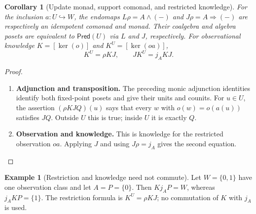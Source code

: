 \documentclass[11pt,a4paper]{article}
\numberwithin{equation}{section}
\newtheorem{corollary}[theorem]{Corollary}
\theoremstyle{definition}
\newtheorem{example}[theorem]{Example}
\theoremstyle{remark}
\theoremstyle{plain}
\begin{document}
\begin{corollary}[Update monad, support comonad, and restricted knowledge]
\label{cor:egt-update-adjoints}
For the inclusion $a:U\hookrightarrow W$, the endomaps
$L\rho=A\wedge(-)$ and $J\rho=A\Rightarrow(-)$ are respectively an
idempotent comonad and monad. Their coalgebra and algebra posets are
equivalent to $\mathsf{Pred}(U)$ via $L$ and $J$, respectively.
For observational knowledge $K=[\ker(o)]$ and $K^U=[\ker(oa)]$,
\[
 K^U=\rho KJ,\qquad JK^U=j_AKJ.
\]
\end{corollary}
\begin{proof}
\leavevmode
\begin{enumerate}[label=\textup{(\arabic*)},leftmargin=*,itemsep=4pt,topsep=3pt]
  \item \textbf{Adjunction and transposition.} The preceding monic adjunction identities identify both fixed-point
posets and give their units and counits. For $u\in U$, the assertion
$(\rho KJQ)(u)$ says that every $w$ with $o(w)=o(a(u))$ satisfies
$JQ$. Outside $U$ this is true; inside $U$ it is exactly $Q$.
  \item \textbf{Observation and knowledge.} This is
knowledge for the restricted observation $oa$. Applying $J$ and using
$J\rho=j_A$ gives the second equation.
\end{enumerate}
\end{proof}

\begin{example}[Restriction and knowledge need not commute]
Let $W=\{0,1\}$ have one observation class and let $A=P=\{0\}$.
Then $Kj_AP=W$, whereas $j_AKP=\{1\}$. The restriction formula is
$K^U=\rho KJ$; no commutation of $K$ with $j_A$ is used.
\end{example}
\end{document}
